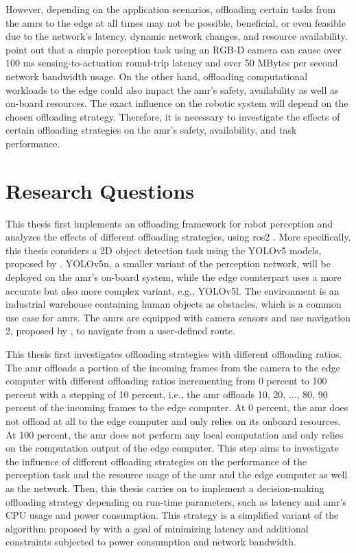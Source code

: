 However, depending on the application scenarios, offloading certain tasks from the \glspl{amr} to the edge at all times may not be possible, beneficial, or even feasible due to the network's latency, dynamic network changes, and resource availability. \citeauthor*{Baxi2022} point out that a simple perception task using an RGB-D camera can cause over 100 ms sensing-to-actuation round-trip latency and over 50 MBytes per second network bandwidth usage. On the other hand, offloading computational workloads to the edge could also impact the \gls{amr}'s safety, availability as well as on-board resources. The exact influence on the robotic system will depend on the chosen offloading strategy. Therefore, it is necessary to investigate the effects of certain offloading strategies on the \gls{amr}'s safety, availability, and task performance.

\section{Research Questions}\label{sec:introduction:research_questions}

This thesis first implements an offloading framework for robot perception and analyzes the effects of different offloading strategies, using \gls{ros}2 \cite{Macenski2022}. More specifically, this thesis considers a 2D object detection task using the YOLOv5 models, proposed by \citeauthor*{Jocher2022}. YOLOv5n, a smaller variant of the perception network, will be deployed on the \gls{amr}'s on-board system, while the edge counterpart uses a more accurate but also more complex variant, e.g., YOLOv5l. The environment is an industrial warehouse containing human objects as obstacles, which is a common use case for \glspl{amr}. The \glspl{amr} are equipped with camera sensors and use navigation 2, proposed by \citeauthor*{Macenski2020}, to navigate from a user-defined route. 

This thesis first investigates offloading strategies with different offloading ratios. The \gls{amr} offloads a portion of the incoming frames from the camera to the edge computer with different offloading ratios incrementing from 0 percent to 100 percent with a stepping of 10 percent, i.e., the \gls{amr} offloads 10, 20, ..., 80, 90 percent of the incoming frames to the edge computer. At 0 percent, the \gls{amr} does not offload at all to the edge computer and only relies on its onboard resources. At 100 percent, the \gls{amr} does not perform any local computation and only relies on the computation output of the edge computer. This step aims to investigate the influence of different offloading strategies on the performance of the perception task and the resource usage of the \gls{amr} and the edge computer as well as the network. Then, this thesis carries on to implement a decision-making offloading strategy depending on run-time parameters, such as latency and \gls{amr}'s CPU usage and power consumption. This strategy is a simplified variant of the algorithm proposed by \citeauthor*{Ning2019} with a goal of minimizing latency and additional constraints subjected to power consumption and network bandwidth. 

